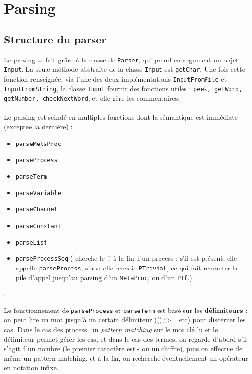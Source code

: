 \documentclass[11pt]{article} %
\begin{document}
\section{Parsing}

\subsection{Structure du parser}
Le parsing se fait grâce à la classe de \texttt{Parser}, qui prend en argument un objet \texttt{Input}.
La seule méthode abstraite de la classe \texttt{Input} est \texttt{getChar}. Une fois cette fonction renseignée, via l'une des deux implémentations \texttt{InputFromFile} et \texttt{InputFromString}, la classe \texttt{Input} fournit des fonctions utiles : \texttt{peek, getWord, getNumber, checkNextWord}, et elle gère les commentaires.\\\\

Le parsing est scindé en multiples fonctions dont la sémantique est immédiate (exceptée la dernière) : 
\begin{itemize}
\item \texttt{parseMetaProc} 
\item \texttt{parseProcess}
\item \texttt{parseTerm}
\item \texttt{parseVariable}
\item \texttt{parseChannel}
\item \texttt{parseConstant}
\item \texttt{parseList}
\item \texttt{parseProcessSeq} ( cherche le '.' à la fin d'un process : s'il est présent, elle appelle \texttt{parseProcess}, sinon elle renvoie \texttt{PTrivial}, ce qui fait remonter la pile d'appel jusqu'au parsing d'un \texttt{MetaProc}, ou d'un \texttt{PIf}.)
\end{itemize}. 

Le fonctionnement de \texttt{parseProcess} et \texttt{parseTerm} est basé sur les \textbf{délimiteurs} : on peut lire un mot jusqu'à un certain délimiteur ((),:>= etc) pour discerner les cas. Dans le cas des process, un \emph{pattern matching} sur le mot clé lu et le délimiteur permet gérer les cas, et dans le cas des termes, on regarde d'abord s'il s'agit d'un nombre (le premier caractère est - ou un chiffre), puis on effectue de même un pattern matching, et à la fin, on recherche éventuellement un opérateur en notation infixe.\\
\end{document}
